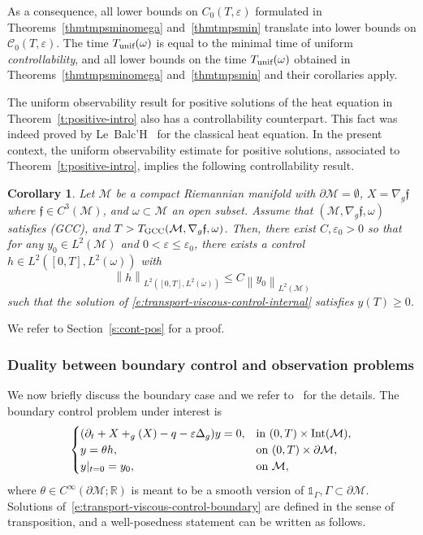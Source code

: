 \documentclass[10pt]{amsart}
\newcommand{\GCC}{\textup{GCC}}
\newcommand{\pGCC}{\textup{(GCC)}\xspace}
\newcommand{\unif}{\textup{unif}}
\newtheorem{corollary}[lemma]{Corollary}
\theoremstyle{definition}
\newcommand{\M}{\ensuremath{\mathcal M}}
\newcommand{\calC}{\ensuremath{\mathcal C}}
\newcommand{\mb}[1]{\ensuremath{\mathbb{#1}}}
\newcommand{\R}{{\mb{R}}}
\newcommand{\f}{\ensuremath{\mathfrak{f}}}
\DeclareMathOperator{\Int}{Int}
\let \div \relax
\DeclareMathOperator{\div}{div}
\newcommand\nor[2]{\left\|#1\right\|_{#2}}
\let\d\partial
\let\e\varepsilon
\let\eps\varepsilon
\let\q q
\begin{document}
As a consequence, all lower bounds on $C_0(T,\eps)$ formulated in Theorems~\ref{thmtmpsminomega} and~\ref{thmtmpsmin} translate into lower bounds on $\calC_0(T,\eps)$. The time $T_{\unif}(\omega)$ is equal to the minimal time of uniform {\em controllability}, and all lower bounds on the time $T_{\unif}(\omega)$ obtained in Theorems~\ref{thmtmpsminomega} and~\ref{thmtmpsmin} and their corollaries apply.

The uniform observability result for positive solutions of the heat equation in Theorem~\ref{t:positive-intro} also has a controllability counterpart.
This fact was indeed proved by Le~Balc'H~\cite[Th.\,4.1]{L:18} for the classical heat equation.
In the present context, the uniform observability estimate for positive solutions, associated to Theorem~\ref{t:positive-intro}, implies the following controllability result.
\begin{corollary}
\label{corcontrol+}
Let $\M$ be a compact Riemannian manifold with $\d\M=\emptyset$, $X=\nabla_{g} \f$ where $\f\in C^{3}(\M)$, and $\omega\subset \M$ an open subset. Assume that $(\M, \nabla_{g} \f,\omega)$ satisfies \pGCC, and $T>T_{\GCC}(\M, \nabla_{g} \f,\omega)$. Then, there exist $C,\e_0>0$ so that for any $y_{0}\in L^{2}(\M)$ and $0<\e\leq \e_{0}$, there exists a control $h\in L^2([0,T],L^2(\omega))$ with
\[
\nor{h}{L^2([0,T],L^2(\omega))}\leq C\nor{y_{0}}{L^{2}(\M)}
\]
such that the solution of \eqref{e:transport-viscous-control-internal} satisfies $y(T)\geq0$.
\end{corollary}
We refer to Section~\ref{s:cont-pos} for a proof.

\subsubsection{Duality between boundary control and observation problems}
\label{s:boundary-shit}
We now briefly discuss the boundary case and we refer to~\cite{GL:07} for the details.
The boundary control problem under interest is
\begin{equation}
\label{e:transport-viscous-control-boundary}
\begin{cases}
(\d_t + X + \div_{g}(X) -\q - \eps \Delta_g ) y = 0, & \text{in } (0,T)\times \Int( \M), \\
y = \theta h, & \text{on } (0,T)\times \d\M, \\
y|_{t=0} = y_0, & \text{on } \M,
\end{cases}
\end{equation}
where $\theta \in C^\infty(\d\M ; \R)$ is meant to be a smooth version of $\mathds{1}_\Gamma, \Gamma \subset \d\M$.
Solutions of~\eqref{e:transport-viscous-control-boundary} are defined in the sense of transposition, and a well-posedness statement can be written as follows.
\end{document}
